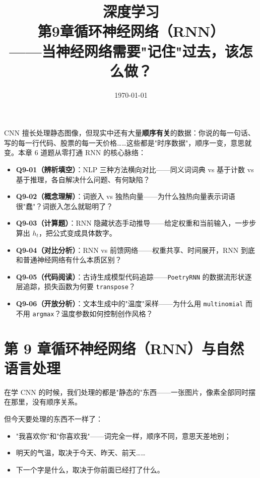 \documentclass[a4paper,11pt]{ctexart}
\title{\textbf{深度学习\\第9章\quad 循环神经网络（RNN）}\\[0.5em]
{\large\color{gray}——当神经网络需要"记住"过去，该怎么做？}}
\date{\today}
\begin{document}
\maketitle

\begin{beginnerbox}
    CNN 擅长处理静态图像，但现实中还有大量\textbf{顺序有关}的数据：你说的每一句话、写的每一行代码、股票的每一天价格……这些都是"时序数据"，顺序一变，意思就变。本章 6 道题从零打通 RNN 的核心脉络：

    \begin{itemize}
        \item \textbf{Q9-01（辨析填空）}：NLP 三种方法横向对比——同义词词典 vs 基于计数 vs 基于推理，各自解决什么问题、有何缺陷？
        \item \textbf{Q9-02（概念理解）}：词嵌入 vs 独热向量——为什么独热向量表示词语很"蠢"？词嵌入怎么就聪明了？
        \item \textbf{Q9-03（计算题）}：RNN 隐藏状态手动推导——给定权重和当前输入，一步步算出 $h_t$，把公式变成具体数字。
        \item \textbf{Q9-04（对比分析）}：RNN vs 前馈网络——权重共享、时间展开，RNN 到底和普通神经网络有什么本质区别？
        \item \textbf{Q9-05（代码阅读）}：古诗生成模型代码追踪——\texttt{PoetryRNN} 的数据流形状逐层追踪，损失函数为何要 \texttt{transpose}？
        \item \textbf{Q9-06（开放分析）}：文本生成中的"温度"采样——为什么用 \texttt{multinomial} 而不用 \texttt{argmax}？温度参数如何控制创作风格？
    \end{itemize}
\end{beginnerbox}

\section{第 9 章\quad 循环神经网络（RNN）与自然语言处理}

在学 CNN 的时候，我们处理的都是"静态的"东西——一张图片，像素全部同时摆在那里，没有顺序关系。

但今天要处理的东西不一样了：

\begin{itemize}
    \item "我喜欢你"和"你喜欢我"——词完全一样，顺序不同，意思天差地别；
    \item 明天的气温，取决于今天、昨天、前天……
    \item 下一个字是什么，取决于你前面已经打了什么。
\end{itemize}
\end{document}
